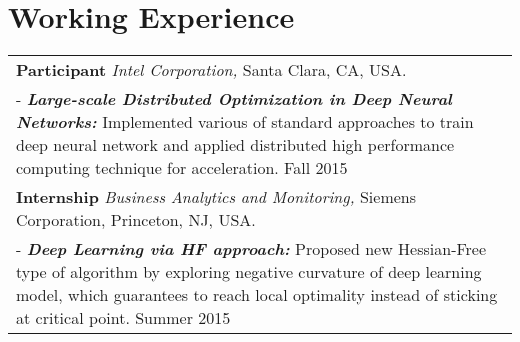 \documentclass[letters,11pt]{article} %
\begin{document}
\section{Working Experience}
\begin{tabular}{p{17.5cm}}
\textbf{Participant} \emph{Intel Corporation,} Santa Clara, CA, USA.\\
\footnotesize{- \textbf{\emph{Large-scale Distributed Optimization in Deep Neural Networks: }}}
Implemented various of standard approaches to train deep neural network and applied distributed high performance computing technique for acceleration. \hfill{Fall 2015}\\
\textbf{Internship} \emph{Business Analytics and Monitoring,} Siemens Corporation, Princeton, NJ, USA.\\
\footnotesize{- \textbf{\emph{Deep Learning via HF approach: }}}
Proposed new Hessian-Free type of algorithm by exploring negative curvature of deep learning model, which guarantees to reach local optimality instead of sticking at critical point. \hfill{Summer 2015}\\

\end{tabular}
\end{document}

